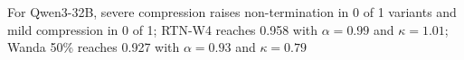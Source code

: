 For Qwen3-32B, severe compression raises non-termination in 0 of 1 variants and mild compression in 0 of 1; RTN-W4 reaches 0.958 with $\alpha=0.99$ and $\kappa=1.01$; Wanda 50\% reaches 0.927 with $\alpha=0.93$ and $\kappa=0.79$%
